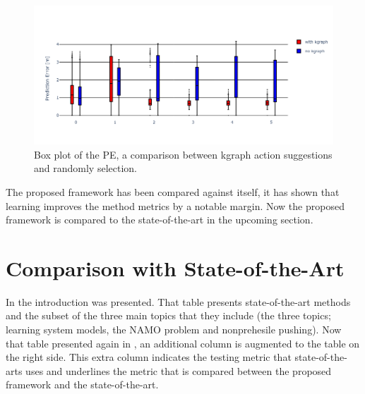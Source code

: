 \begin{figure}[H]
    \centering
    \includegraphics[width=\textwidth]{figures/results/random_push_pe_vs}
    \caption{Box plot of the \acl{PE}, a comparison between \ac{kgraph} action suggestions and randomly selection.}%
    \label{fig:random_push_pe_vs}
\end{figure}

The proposed framework has been compared against itself, it has shown that learning improves the method metrics by a notable margin. Now the proposed framework is compared to the state-of-the-art in the upcoming section.\bs

\section{Comparison with State-of-the-Art}%
\label{sec:compare_with_related_papers}
In the introduction  was presented. That table presents state-of-the-art methods and the subset of the three main topics that they include (the three topics; learning system models, the \ac{NAMO} problem and nonprehesile pushing). Now that table presented again in , an additional column is augmented to the table on the right side. This extra column indicates the testing metric that state-of-the-arts uses and underlines the metric that is compared between the proposed framework and the state-of-the-art.\bs

